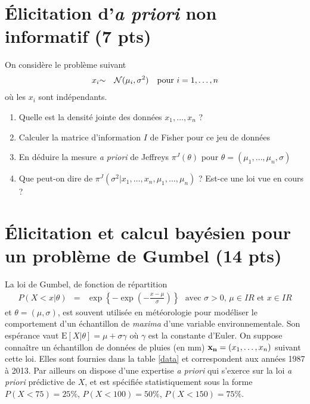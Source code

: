 \documentclass[10pt]{article}
\newcommand{\R}{I\!\!R}
\newcommand{\E}{\mbox{E}}
\newcommand{\1}{\mathbbm{1}}
\begin{document}
\section{\'Elicitation d'{\it a priori} non informatif (7 pts)}

On considère le problème suivant
\begin{eqnarray*}
x_i & {\sim} & {\cal{N}}(\mu_i,\sigma^2) \ \ \ \text{pour $i=1,\ldots,n$}
\end{eqnarray*}
où les $x_i$ sont indépendants. 

\begin{enumerate}
\item Quelle est la densité jointe des données $x_1,\ldots,x_n$ ?
\item Calculer la matrice d'information $I$ de Fisher pour ce jeu de données
\item En déduire la mesure {\it a priori} de Jeffreys $\pi^J(\theta)$ pour $\theta=(\mu_1,\ldots,\mu_n,\sigma)$
\item Que peut-on dire de $\pi^J(\sigma^2|x_1,\ldots,x_n,\mu_1,\ldots,\mu_n)$ ? Est-ce une loi vue en cours ? 
\end{enumerate}

\section{\'Elicitation et calcul bayésien pour un problème de Gumbel (14 pts)}

La loi de Gumbel, de fonction de r\'epartition
\begin{eqnarray*}
P(X<x|\theta) & = & \exp\left\{-\exp\left(-\frac{x-\mu}{\sigma}\right)\right\} \ \ \ \text{avec $\sigma>0$, $\mu\in\R$ et $x\in\R$}
\end{eqnarray*}
et $\theta=(\mu,\sigma)$,  est souvent utilis\'ee en météorologie  pour modéliser le comportement d'un échantillon de {\it maxima} d'une variable environnementale. Son espérance vaut $\E[X|\theta]=\mu + \sigma \gamma$ où $\gamma$ est la constante d'Euler. On suppose connaître un échantillon de données de pluies (en mm) ${\bf x_n}=(x_1,\ldots,x_n)$ suivant cette loi. Elles sont fournies dans la table \ref{data} et correspondent aux années 1987 à 2013. Par ailleurs on dispose d'une expertise {\it a priori} qui s'exerce sur la loi {\it a priori} prédictive de $X$, et est spécifiée statistiquement sous la forme
$P(X<75)=25\%$, $P(X<100)=50\%$, $P(X<150)=75\%$. \\
\end{document}
